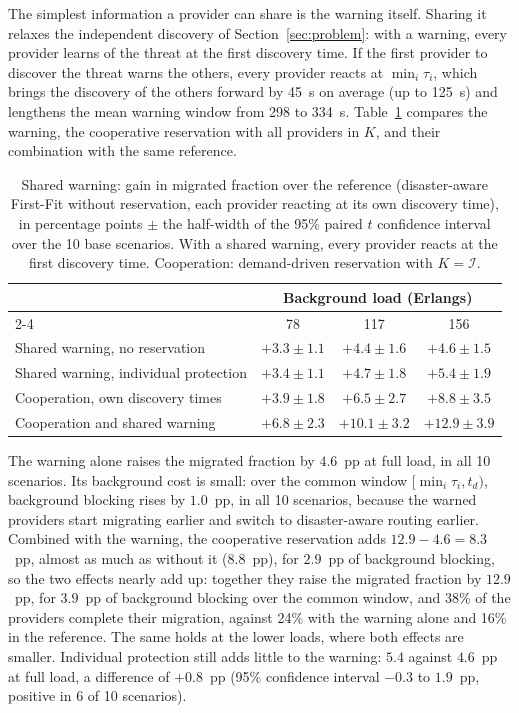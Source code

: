 \documentclass[11pt,a4paper]{article}
\theoremstyle{definition}
\begin{document}
The simplest information a provider can share is the warning itself.
Sharing it relaxes the independent discovery of Section~\ref{sec:problem}: with a warning, every provider learns of the threat at the first discovery time.
If the first provider to discover the threat warns the others, every provider reacts at $\min_i\tau_i$, which brings the discovery of the others forward by 45~s on average (up to 125~s) and lengthens the mean warning window from 298 to 334~s.
Table~\ref{tab:warning} compares the warning, the cooperative reservation with all providers in $K$, and their combination with the same reference.

\begin{table}[!htb]
\centering
\small
\caption{Shared warning: gain in migrated fraction over the reference (disaster-aware First-Fit without reservation, each provider reacting at its own discovery time), in percentage points $\pm$ the half-width of the 95\% paired $t$ confidence interval over the 10 base scenarios. With a shared warning, every provider reacts at the first discovery time. Cooperation: demand-driven reservation with $K=\mathcal{I}$.}
\label{tab:warning}
\setlength{\tabcolsep}{4pt}
\begin{tabular}{@{}lccc@{}}
\toprule
 & \multicolumn{3}{c}{Background load (Erlangs)} \\
\cmidrule(l){2-4}
 & 78 & 117 & 156 \\
\midrule
Shared warning, no reservation & $+3.3\pm1.1$ & $+4.4\pm1.6$ & $+4.6\pm1.5$ \\
Shared warning, individual protection & $+3.4\pm1.1$ & $+4.7\pm1.8$ & $+5.4\pm1.9$ \\
Cooperation, own discovery times & $+3.9\pm1.8$ & $+6.5\pm2.7$ & $+8.8\pm3.5$ \\
Cooperation and shared warning & $+6.8\pm2.3$ & $+10.1\pm3.2$ & $+12.9\pm3.9$ \\
\end{tabular}
\end{table}

The warning alone raises the migrated fraction by $4.6$~pp at full load, in all 10 scenarios. Its background cost is small: over the common window $[\min_i\tau_i,t_d)$, background blocking rises by $1.0$~pp, in all 10 scenarios, because the warned providers start migrating earlier and switch to disaster-aware routing earlier.
Combined with the warning, the cooperative reservation adds $12.9-4.6=8.3$~pp, almost as much as without it ($8.8$~pp), for $2.9$~pp of background blocking, so the two effects nearly add up: together they raise the migrated fraction by $12.9$~pp, for $3.9$~pp of background blocking over the common window, and 38\% of the providers complete their migration, against 24\% with the warning alone and 16\% in the reference.
The same holds at the lower loads, where both effects are smaller.
Individual protection still adds little to the warning: $5.4$ against $4.6$~pp at full load, a difference of $+0.8$~pp (95\% confidence interval $-0.3$ to $1.9$~pp, positive in 6 of 10 scenarios).
\end{document}

